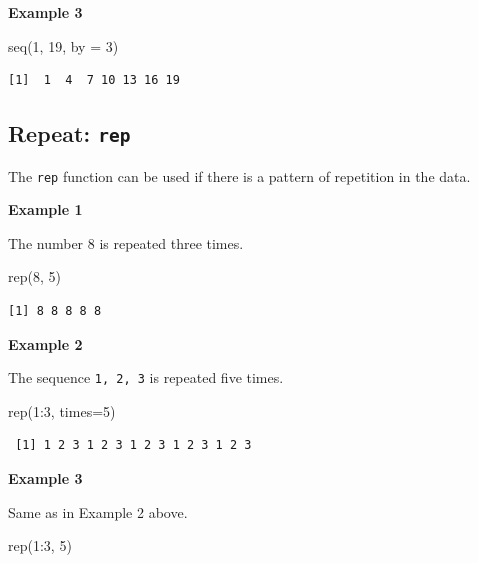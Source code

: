 \documentclass[
  letterpaper,
  DIV=11,
  numbers=noendperiod]{scrreprt}
\newenvironment{Shaded}{\begin{snugshade}}{\end{snugshade}}
\newcommand{\AttributeTok}[1]{\textcolor[rgb]{0.40,0.45,0.13}{#1}}
\newcommand{\DecValTok}[1]{\textcolor[rgb]{0.68,0.00,0.00}{#1}}
\newcommand{\FunctionTok}[1]{\textcolor[rgb]{0.28,0.35,0.67}{#1}}
\newcommand{\NormalTok}[1]{\textcolor[rgb]{0.00,0.23,0.31}{#1}}
\newcommand{\SpecialCharTok}[1]{\textcolor[rgb]{0.37,0.37,0.37}{#1}}
\begin{document}
\textbf{Example 3}

\begin{Shaded}
\begin{Highlighting}[]
\FunctionTok{seq}\NormalTok{(}\DecValTok{1}\NormalTok{, }\DecValTok{19}\NormalTok{, }\AttributeTok{by =} \DecValTok{3}\NormalTok{)}
\end{Highlighting}
\end{Shaded}

\begin{verbatim}
[1]  1  4  7 10 13 16 19
\end{verbatim}

\subsection{\texorpdfstring{Repeat:
\texttt{rep}}{Repeat: rep}}\label{repeat-rep}

The \texttt{rep} function can be used if there is a pattern of
repetition in the data.

\textbf{Example 1}

The number 8 is repeated three times.

\begin{Shaded}
\begin{Highlighting}[]
\FunctionTok{rep}\NormalTok{(}\DecValTok{8}\NormalTok{, }\DecValTok{5}\NormalTok{)}
\end{Highlighting}
\end{Shaded}

\begin{verbatim}
[1] 8 8 8 8 8
\end{verbatim}

\textbf{Example 2}

The sequence \texttt{1,\ 2,\ 3} is repeated five times.

\begin{Shaded}
\begin{Highlighting}[]
\FunctionTok{rep}\NormalTok{(}\DecValTok{1}\SpecialCharTok{:}\DecValTok{3}\NormalTok{, }\AttributeTok{times=}\DecValTok{5}\NormalTok{)}
\end{Highlighting}
\end{Shaded}

\begin{verbatim}
 [1] 1 2 3 1 2 3 1 2 3 1 2 3 1 2 3
\end{verbatim}

\textbf{Example 3}

Same as in Example 2 above.

\begin{Shaded}
\begin{Highlighting}[]
\FunctionTok{rep}\NormalTok{(}\DecValTok{1}\SpecialCharTok{:}\DecValTok{3}\NormalTok{, }\DecValTok{5}\NormalTok{)}
\end{Highlighting}
\end{Shaded}
\end{document}
